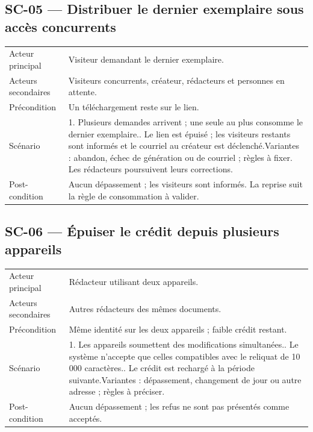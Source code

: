 \subsection{SC-05 --- Distribuer le dernier exemplaire sous accès concurrents}
\begin{longtable}{@{}L{30mm}L{126mm}@{}}
\toprule
Acteur principal & Visiteur demandant le dernier exemplaire.\\
Acteurs secondaires & Visiteurs concurrents, créateur, rédacteurs et personnes en attente.\\
Précondition & Un téléchargement reste sur le lien.\\
Scénario & 1. Plusieurs demandes arrivent ; une seule au plus consomme le dernier exemplaire.. Le lien est épuisé ; les visiteurs restants sont informés et le courriel au créateur est déclenché.\newline Variantes : abandon, échec de génération ou de courriel ; règles à fixer. Les rédacteurs poursuivent leurs corrections.\\
Post-condition & Aucun dépassement ; les visiteurs sont informés. La reprise suit la règle de consommation à valider.\\
\bottomrule
\end{longtable}
\subsection{SC-06 --- Épuiser le crédit depuis plusieurs appareils}
\begin{longtable}{@{}L{30mm}L{126mm}@{}}
\toprule
Acteur principal & Rédacteur utilisant deux appareils.\\
Acteurs secondaires & Autres rédacteurs des mêmes documents.\\
Précondition & Même identité sur les deux appareils ; faible crédit restant.\\
Scénario & 1. Les appareils soumettent des modifications simultanées.. Le système n’accepte que celles compatibles avec le reliquat de 10\,000 caractères.. Le crédit est rechargé à la période suivante.\newline Variantes : dépassement, changement de jour ou autre adresse ; règles à préciser.\\
Post-condition & Aucun dépassement ; les refus ne sont pas présentés comme acceptés.\\
\bottomrule
\end{longtable}
